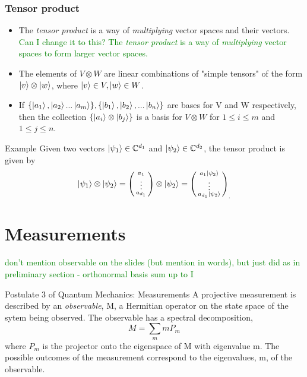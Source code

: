 \documentclass[handout, 10 pt]{beamer}
\newcommand{\icol}[1]{%
  \left(\begin{smallmatrix}#1\end{smallmatrix}\right)%
}
\begin{document}
\begin{frame}
\frametitle{Tensor product}
\begin{itemize}
    \item The \textit{tensor product} is a way of {\emph{multiplying}} vector spaces and their vectors. \textcolor{green}{Can I change it to this? The \textit{tensor product} is a way of {\emph{multiplying}} vector spaces to form larger vector spaces.}
    \pause
    \item The elements of $V \otimes W$ are linear combinations of "simple tensors" of the form $\ket{v} \otimes \ket{w}$, where $\ket{v} \in V, \ket{w} \in W$. 
    \pause
    \item If $\{\ket{a_1}, \ket{a_2}...\ket{a_m}\}, \{\ket{b_1},\ket{b_2}, ...\ket{b_n}\}$ are bases for V and W respectively, then the collection $\{\ket{a_i}\otimes\ket{b_j}\}$ is a basis for $V \otimes W$ for $1\leq i \leq m$ and $1 \leq j \leq n$.
\end{itemize}
\pause
\begin{block}{Example}
Given two vectors $\ket{\psi_1}\in\mathbb{C}^{d_1}$ and $\ket{\psi_2}\in\mathbb{C}^{d_2}$, the tensor product is given by
\begin{equation}
\ket{\psi_1} \otimes\ket{\psi_2} = \icol{ a_1\\ \vdots \\ a_{d_1}} \otimes \ket{\psi_2} = {\icol{ a_1\ket{\psi_2}\\ \vdots \\a_{d_1}\ket{\psi_2}}}_.
\end{equation}
\end{block}
\end{frame}

\section{Measurements}
\textcolor{green}{don't mention observable on the slides (but mention in words), but just did as in preliminary section - orthonormal basis sum up to I}

\begin{frame}{Postulate 3 of Quantum Mechanics: Measurements}
    A projective measurement is described by an \textit{observable}, M, a Hermitian operator on the state space of the sytem being observed. The observable has a spectral decomposition,
    \begin{equation}
        M=\sum_m m P_m
    \end{equation}
    where $P_m$ is the projector onto the eigenspace of M with eigenvalue m. The possible outcomes of the measurement correspond to the eigenvalues, m, of the observable.
\end{frame}
\end{document}
